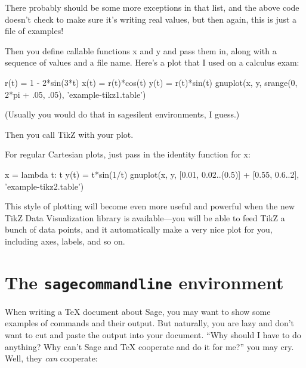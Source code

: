 \documentclass{article}
\begin{document}
There probably should be some more exceptions in that list, and the
above code doesn't check to make sure it's writing real values, but then
again, this is just a file of examples!

Then you define callable functions x and y and pass them in, along with
a sequence of values and a file name. Here's a plot that I used on a
calculus exam:

\begin{sageblock}
  r(t) = 1 - 2*sin(3*t)
  x(t) = r(t)*cos(t)
  y(t) = r(t)*sin(t)
  gnuplot(x, y, srange(0, 2*pi + .05, .05), 'example-tikz1.table')
\end{sageblock}

(Usually you would do that in sagesilent environments, I guess.)

Then you call TikZ with your plot.


For regular Cartesian plots, just pass in the identity function for x:

\begin{sageblock}
  x = lambda t: t
  y(t) = t*sin(1/t)
  gnuplot(x, y, [0.01, 0.02..(0.5)] + [0.55, 0.6..2], 'example-tikz2.table')
\end{sageblock}

\begin{center}
\end{center}

This style of plotting will become even more useful and powerful when
the new TikZ Data Visualization library is available---you will be able
to feed TikZ a bunch of data points, and it automatically make a very
nice plot for you, including axes, labels, and so on.



\section{The \texttt{sagecommandline} environment}

When writing a \TeX{} document about Sage, you may want to show some
examples of commands and their output. But naturally, you are lazy and
don't want to cut and paste the output into your document. ``Why should
I have to do anything? Why can't Sage and \TeX{} cooperate and do it for
me?'' you may cry. Well, they \emph{can} cooperate:
\end{document}
